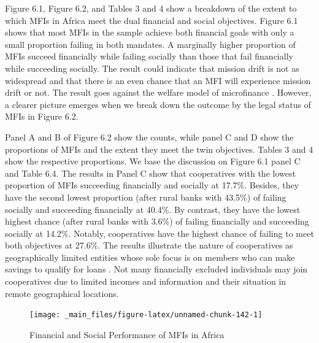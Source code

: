 \documentclass[a4paper, nobind]{templates/ociamthesis}
\begin{document}
Figure 6.1, Figure 6.2, and Tables 3 and 4 show a breakdown of the extent to which MFIs in Africa meet the dual financial and social objectives. Figure 6.1 shows that most MFIs in the sample achieve both financial goals with only a small proportion failing in both mandates. A marginally higher proportion of MFIs succeed financially while failing socially than those that fail financially while succeeding socially. The result could indicate that mission drift is not as widespread and that there is an even chance that an MFI will experience mission drift or not. The result goes against the welfare model of microfinance \autocite{d2017ngos}. However, a clearer picture emerges when we break down the outcome by the legal status of MFIs in Figure 6.2.

Panel A and B of Figure 6.2 show the counts, while panel C and D show the proportions of MFIs and the extent they meet the twin objectives. Tables 3 and 4 show the respective proportions. We base the discussion on Figure 6.1 panel C and Table 6.4. The results in Panel C show that cooperatives with the lowest proportion of MFIs succeeding financially and socially at 17.7\%. Besides, they have the second lowest proportion (after rural banks with 43.5\%) of failing socially and succeeding financially at 40.4\%. By contrast, they have the lowest highest chance (after rural banks with 3.6\%) of failing financially and succeeding socially at 14.2\%. Notably, cooperatives have the highest chance of failing to meet both objectives at 27.6\%. The results illustrate the nature of cooperatives as geographically limited entities whose sole focus is on members who can make savings to qualify for loans \autocite{porter1987economic}. Not many financially excluded individuals may join cooperatives due to limited incomes and information and their situation in remote geographical locations.

\newpage

\begin{landscape}

\begin{figure}

{\centering \texttt{[image: \_main\_files/figure-latex/unnamed-chunk-142-1]} 

}

\caption{Financial and Social Performance of MFIs in Africa}\label{fig:unnamed-chunk-142}
\end{figure}

\end{landscape}
\end{document}
